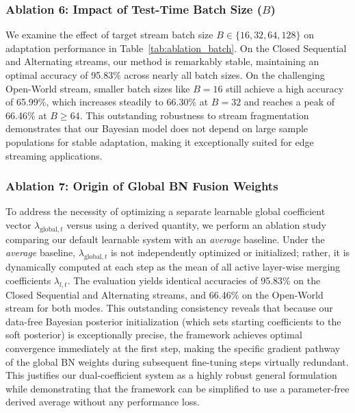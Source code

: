 \documentclass{article}
\theoremstyle{plain}
\theoremstyle{definition}
\theoremstyle{remark}
\begin{document}
\subsubsection{Ablation 6: Impact of Test-Time Batch Size ($B$)}\vspace{-0.1in}
We examine the effect of target stream batch size $B \in \{16, 32, 64, 128\}$ on adaptation
performance in Table~\ref{tab:ablation_batch}.
On the Closed Sequential and Alternating streams, our method is remarkably stable, maintaining an
optimal accuracy of 95.83\% across nearly all batch sizes.
On the challenging Open-World stream, smaller batch sizes like $B=16$ still achieve a high accuracy
of 65.99\%, which increases steadily to 66.30\% at $B=32$ and reaches a peak of 66.46\% at $B \ge
64$.
This outstanding robustness to stream fragmentation demonstrates that our Bayesian model does not depend on large sample populations for stable adaptation, making it exceptionally suited for edge streaming applications.

\subsubsection{Ablation 7: Origin of Global BN Fusion Weights}\vspace{-0.1in}
To address the necessity of optimizing a separate learnable global coefficient vector $\lambda_{\text{global},t}$ versus using a derived quantity, we perform an ablation study comparing our default learnable system with an \emph{average} baseline. Under the \emph{average} baseline, $\lambda_{\text{global},t}$ is not independently optimized or initialized; rather, it is dynamically computed at each step as the mean of all active layer-wise merging coefficients $\lambda_{l,t}$. 
The evaluation yields identical accuracies of 95.83\% on the Closed Sequential and Alternating streams, and 66.46\% on the Open-World stream for both modes. This outstanding consistency reveals that because our data-free Bayesian posterior initialization (which sets starting coefficients to the soft posterior) is exceptionally precise, the framework achieves optimal convergence immediately at the first step, making the specific gradient pathway of the global BN weights during subsequent fine-tuning steps virtually redundant. This justifies our dual-coefficient system as a highly robust general formulation while demonstrating that the framework can be simplified to use a parameter-free derived average without any performance loss.
\end{document}
